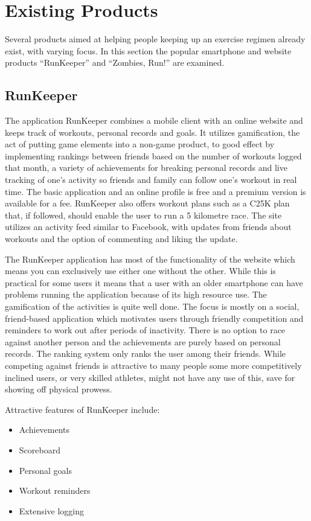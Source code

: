 \section{Existing Products}
Several products aimed at helping people keeping up an exercise regimen already exist, with varying focus. In this section the popular smartphone and website products ``RunKeeper'' and ``Zombies, Run!'' are examined. 

\subsection{RunKeeper}
The application RunKeeper combines a mobile client with an online website and keeps track of workouts, personal records and goals. It utilizes gamification, the act of putting game elements into a non-game product, to good effect by implementing rankings between friends based on the number of workouts logged that month, a variety of achievements for breaking personal records and live tracking of one's activity so friends and family can follow one's workout in real time. The basic application and an online profile is free and a premium version is available for a fee. RunKeeper also offers workout plans such as a \ac{C25K} plan that, if followed, should enable the user to run a 5 kilometre race. The site utilizes an activity feed similar to Facebook, with updates from friends about workouts and the option of commenting and liking the update. 

The RunKeeper application has most of the functionality of the website which means you can exclusively use either one without the other. While this is practical for some users it means that a user with an older smartphone can have problems running the application because of its high resource use. The gamification of the activities is quite well done. The focus is mostly on a social, friend-based application which motivates users through friendly competition and reminders to work out after periods of inactivity. There is no option to race against another person and the achievements are purely based on personal records. The ranking system only ranks the user among their friends. While competing against friends is attractive to many people some more competitively inclined users, or very skilled athletes, might not have any use of this, save for showing off physical prowess.

Attractive features of RunKeeper include:

\begin{itemize}
	\item{Achievements}
	\item{Scoreboard}
	\item{Personal goals}
	\item{Workout reminders}
	\item{Extensive logging}
\end{itemize}

